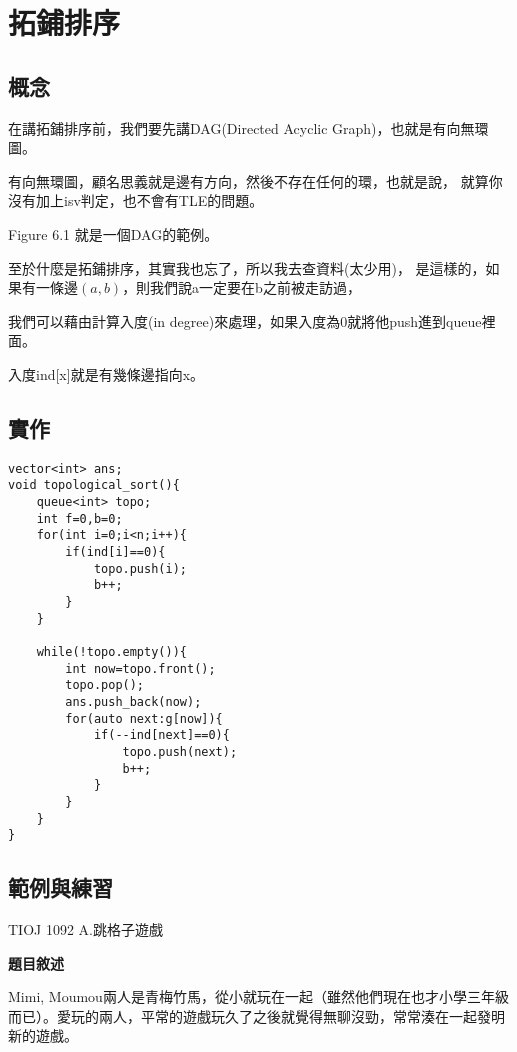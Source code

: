 \section{拓鋪排序}
    \subsection{概念}
    在講拓鋪排序前，我們要先講DAG(Directed Acyclic Graph)，也就是有向無環圖。

    有向無環圖，顧名思義就是邊有方向，然後不存在任何的環，也就是說，
    就算你沒有加上isv判定，也不會有TLE的問題。

    Figure 6.1 就是一個DAG的範例。

    至於什麼是拓鋪排序，其實我也忘了，所以我去查資料(太少用)，
    是這樣的，如果有一條邊$(a,b)$，則我們說a一定要在b之前被走訪過，

    我們可以藉由計算入度(in degree)來處理，如果入度為0就將他push進到queue裡面。

    \begin{tip}
        入度ind[x]就是有幾條邊指向x。
    \end{tip}

    \subsection{實作}

\begin{lstlisting}[caption=拓鋪排序]
vector<int> ans;
void topological_sort(){
    queue<int> topo;
    int f=0,b=0;
    for(int i=0;i<n;i++){
        if(ind[i]==0){
            topo.push(i);
            b++;
        }
    }
    
    while(!topo.empty()){
        int now=topo.front();
        topo.pop();
        ans.push_back(now);
        for(auto next:g[now]){
            if(--ind[next]==0){
                topo.push(next);
                b++;
            }
        }
    }
}
\end{lstlisting}

    \subsection{範例與練習}

    \problem TIOJ 1092 A.跳格子遊戲

    \textbf{題目敘述}

    Mimi, Moumou兩人是青梅竹馬，從小就玩在一起（雖然他們現在也才小學三年級而已）。愛玩的兩人，平常的遊戲玩久了之後就覺得無聊沒勁，常常湊在一起發明新的遊戲。

